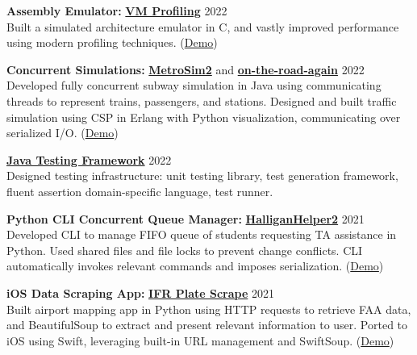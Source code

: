 \documentclass[letter,10pt]{article}
\begin{document}
\begin{minipage}[t]{\linewidth}
    \textbf{Assembly Emulator:} \href{https://github.com/liam-strand/comp-40-VM-Profiling}{\textbf{VM Profiling}} \hfill 2022 \\
    Built a simulated architecture emulator in C, and vastly improved performance using modern profiling techniques. (\href{https://youtu.be/OnzkSmFvxiM}{Demo})
\end{minipage}

\begin{minipage}[t]{\linewidth}
    \textbf{Concurrent Simulations:} \href{https://github.com/liam-strand/cs121-p5\#metrosim2}{\textbf{MetroSim2}} and \href{https://github.com/liam-strand/cs-21-final-project}{\textbf{on-the-road-again}} \hfill 2022 \\
    Developed fully concurrent subway simulation in Java using communicating threads to represent trains, passengers, and stations. Designed and built traffic simulation using CSP in Erlang with Python visualization, communicating over serialized I/O. (\href{https://youtu.be/_JQW8edL14A}{Demo}) 
\end{minipage}

\begin{minipage}[t]{\linewidth}
    \href{https://github.com/liam-strand/cs121-p3\#testing-in-java}{\textbf{Java Testing Framework}} \hfill 2022 \\
    Designed testing infrastructure: unit testing library, test generation framework, fluent assertion domain-specific language, test runner.
\end{minipage}

\begin{minipage}[t]{\linewidth}
    \textbf{Python CLI Concurrent Queue Manager:} \href{https://github.com/liam-strand/HalliganHelper2}{\textbf{HalliganHelper2}} \hfill 2021 \\
    Developed CLI to manage FIFO queue of students requesting TA assistance in Python. Used shared files and file locks to prevent change conflicts. CLI automatically invokes relevant commands and imposes serialization. (\href{https://youtu.be/qPwZz3OVA7A}{Demo})
\end{minipage}

\begin{minipage}[t]{\linewidth}
    \textbf{iOS Data Scraping App:} \href{https://github.com/liam-strand/IFR-Plate-Scrape}{\textbf{IFR Plate Scrape}} \hfill 2021 \\
    Built airport mapping app in Python using HTTP requests to retrieve FAA data, and BeautifulSoup to extract and present relevant information to user. Ported to iOS using Swift, leveraging built-in URL management and SwiftSoup. (\href{https://youtu.be/bDe3dsVyUok}{Demo})
\end{minipage}
\end{document}
